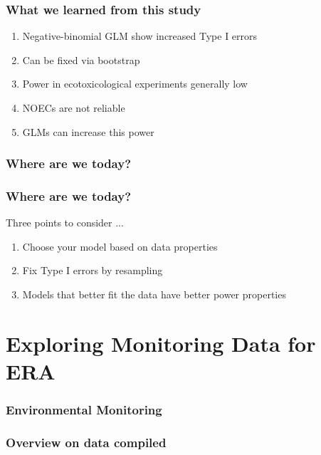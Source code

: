\documentclass[10pt
	]{beamer}
\begin{document}
\begin{frame}
\frametitle{What we learned from this study}
		\begin{enumerate}
			\item Negative-binomial GLM show increased Type I errors
			\item Can be fixed via bootstrap
			\item Power in ecotoxicological experiments generally low
			\item NOECs are not reliable
			\item GLMs can increase this power
		\end{enumerate}
\end{frame}


\begin{frame}
\frametitle{Where are we today?}
	
\end{frame}


{%
\begin{frame}
\frametitle{Where are we today?}
	\begin{exampleblock}{Three points to consider ...}
		\begin{enumerate}
			\item Choose your model based on data properties
			\item Fix Type I errors by resampling
			\item Models that better fit the data have better power properties
		\end{enumerate}
	\end{exampleblock}
\end{frame}
}

\section{Exploring Monitoring Data for ERA}

\begin{frame}
\frametitle{Environmental Monitoring}

\end{frame}

\begin{frame}
\frametitle{Overview on data compiled}

\end{frame}
\end{document}
